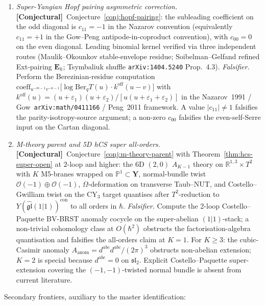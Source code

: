 \documentclass[11pt]{amsart}
\theoremstyle{definition}
\providecommand{\bY}{\mathbf{Y}}
\providecommand{\cO}{\mathcal{O}}
\providecommand{\bR}{\mathbb{R}}
\providecommand{\bP}{\mathbb{P}}
\providecommand{\fgl}{\mathfrak{gl}}
\providecommand{\fsl}{\mathfrak{sl}}
\providecommand{\ClaimStatusConjectured}{\textbf{\textsf{[Conjectural]}}}
\begin{document}
\begin{enumerate}[label=\emph{$\mathsf F_{\arabic*}$.}, leftmargin=2.4em]
\item \emph{Super-Yangian Hopf pairing asymmetric correction.}
  \ClaimStatusConjectured\
  Conjecture~\ref{conj:hopf-pairing}: the subleading coefficient on
  the odd diagonal is $c_{11} = -1$ in the Nazarov convention
  (equivalently $c_{11} = +1$ in the Gow--Peng
  antipode-in-coproduct convention), with $c_{00} = 0$ on the even
  diagonal. Leading binomial kernel verified via three independent
  routes (Maulik--Okounkov stable-envelope residue;
  Soibelman--Gelfand refined Ext-pairing $\mathbf E_{\hbar}$;
  Tsymbaliuk shuffle \texttt{arXiv:1404.5240} Prop.~4.3).
  \emph{Falsifier.} Perform the Berezinian-residue computation
  $\mathrm{coeff}_{u^{-m-1}v^{-n-1}}\!
   \bigl[\log\mathrm{Ber}_{q}T(u)\cdot k^{\mathrm{off}}(u-v)\bigr]$
  with
  $k^{\mathrm{off}}(u)
   = (u+\varepsilon_{1})(u+\varepsilon_{2})/
     [u(u+\varepsilon_{1}+\varepsilon_{2})]$
  in the Nazarov~1991 / Gow~\texttt{arXiv:math/0411166} / Peng~2011
  framework. A value $|c_{11}|\neq 1$ falsifies the
  parity-isotropy-source argument; a non-zero $c_{00}$ falsifies the
  even-self-Serre input on the Cartan diagonal.

\item \emph{M-theory parent and 5D hCS super all-orders.}
  \ClaimStatusConjectured\
  Conjecture~\ref{conj:m-theory-parent} with
  Theorem~\ref{thm:hcs-super-open} at $2$-loop and higher: the 6D
  $(2,0)$ $A_{K-1}$ theory on $\bR^{1,3}\times T^{2}$ with $K$
  M5-branes wrapped on $\bP^{1}\subset\bY$, normal-bundle twist
  $\cO(-1)\oplus\cO(-1)$, $\Omega$-deformation on transverse
  Taub--NUT, and Costello--Gwilliam twist on the CY$_{3}$ target
  quantises after $T^{2}$-reduction to
  $Y(\widehat{\fgl}(1|1))^{\mathrm{con}}$ to all orders in $\hbar$.
  \emph{Falsifier.} Compute the 2-loop Costello--Paquette BV-BRST
  anomaly cocycle on the super-abelian $(1|1)$-stack; a non-trivial
  cohomology class at $O(\hbar^{2})$ obstructs the
  factorisation-algebra quantisation and falsifies the all-orders
  claim at $K=1$. For $K\geq 3$: the cubic-Casimir anomaly
  $A_{\mathrm{anom}} = d^{abc}d^{abc}/(2\pi)^{3}$ obstructs
  non-abelian extension; $K=2$ is special because $d^{abc} = 0$ on
  $\fsl_{2}$. Explicit Costello--Paquette super-extension covering
  the $(-1,-1)$-twisted normal bundle is absent from current
  literature.
\end{enumerate}

Secondary frontiers, auxiliary to the master identification:
\end{document}
